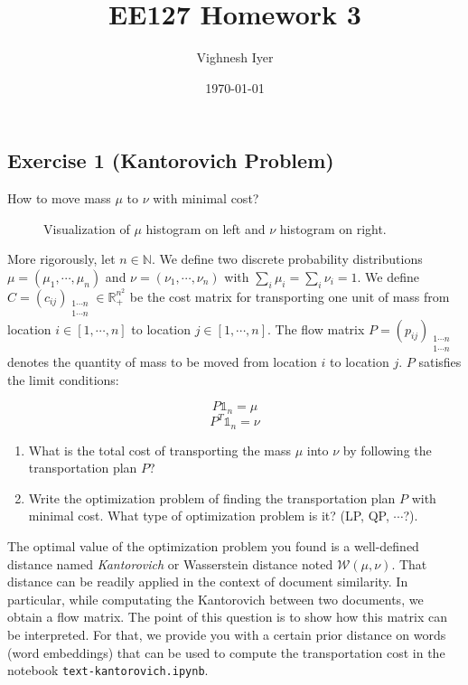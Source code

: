 \documentclass[11pt]{article}
\begin{document}
\title{EE127 Homework 3}
\author{Vighnesh Iyer}
\date{\today}
\maketitle

\subsection*{Exercise 1 (Kantorovich Problem)}

How to move mass $\mu$ to $\nu$ with minimal cost?

\begin{figure}[ht]
\centering
\caption{Visualization of $\mu$ histogram on left and $\nu$ histogram on right.}
\label{fig:histogram}
\end{figure}

More rigorously, let $n \in \mathbb{N}$. We define two discrete probability distributions $\mu = (\mu_1, \cdots, \mu_n)$ and $\nu = (\nu_1, \cdots, \nu_n)$ with $\sum_i \mu_i = \sum_i \nu_i = 1$. We define $C = (c_{ij})_{\substack{{1\cdots n} \\ {1\cdots n}}} \in \mathbb{R}_+^{n^2}$ be the cost matrix for transporting one unit of mass from location $i \in [1, \cdots, n]$ to location $j \in [1, \cdots, n]$. The flow matrix $P = (p_{ij})_{\substack{{1 \cdots n} \\ {1 \cdots n}}}$ denotes the quantity of mass to be moved from location $i$ to location $j$. $P$ satisfies the limit conditions:

\[
P \mathbb{1}_n = \mu
\]
\[
P^T \mathbb{1}_n = \nu
\]

\begin{enumerate}

\item What is the total cost of transporting the mass $\mu$ into $\nu$ by following the transportation plan $P$?

\item Write the optimization problem of finding the transportation plan $P$ with minimal cost. What type of optimization problem is it? (LP, QP, $\cdots$?).

\end{enumerate}

The optimal value of the optimization problem you found is a well-defined distance named \emph{Kantorovich} or Wasserstein distance noted $\mathcal{W}(\mu, \nu)$. That distance can be readily applied in the context of document similarity. In particular, while computating the Kantorovich between two documents, we obtain a flow matrix. The point of this question is to show how this matrix can be interpreted. For that, we provide you with a certain prior distance on words (word embeddings) that can be used to compute the transportation cost in the notebook \verb+text-kantorovich.ipynb+.
\end{document}
